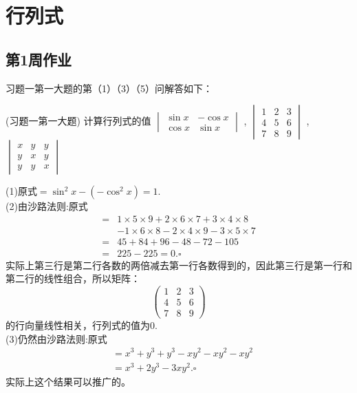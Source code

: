 \chapter{行列式}
\section{第1周作业}
习题一第一大题的第（1）（3）（5）问解答如下：
\begin{example}{(习题一第一大题)}{}
计算行列式的值
$\begin{vmatrix}
    \sin x & -\cos x \\
    \cos x & \sin x
\end{vmatrix}$
,
$\begin{vmatrix}
    1 & 2 & 3 \\
    4 & 5 & 6 \\
    7 & 8 & 9
\end{vmatrix}$
,
$\begin{vmatrix}
    x & y & y \\
    y & x & y \\
    y & y & x
\end{vmatrix}$
\end{example}
\begin{solution}{}{}
    (1)原式$=\sin^2x-(-\cos^2x)=1$.\\
    (2)由沙路法则:原式\vspace{-10pt}\\
    \vspace{-10pt}
    \begin{align*}
        =&1\times5\times9+2\times6\times7+3\times4\times8\\
        &-1\times6\times8-2\times4\times9-3\times5\times7\\
        =&45+84+96-48-72-105\\
        =&225-225=0.\square
    \end{align*}
    实际上第三行是第二行各数的两倍减去第一行各数得到的，因此第三行是第一行和第二行的线性组合，所以矩阵：
    \[
    \begin{pmatrix} 
        1 & 2 & 3 \\
        4 & 5 & 6 \\
        7 & 8 & 9
    \end{pmatrix}
    \]的行向量线性相关，行列式的值为0.\\
    (3)仍然由沙路法则:原式\vspace{=-10pt}
    \begin{align*}
        &=x^3+y^3+y^3-xy^2-xy^2-xy^2\\
        &=x^3+2y^3-3xy^2.\square
    \end{align*}
    实际上这个结果可以推广的。
\end{solution}
